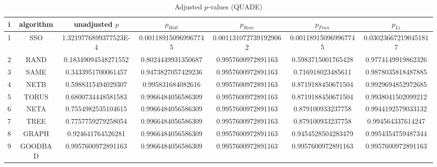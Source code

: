 \documentclass[a4paper,10pt]{article}
\begin{document}
\begin{landscape}
\begin{table}[!htp]
\centering\scriptsize
\caption{Adjusted $p$-values (QUADE)}
\begin{tabular}{ccccccc}
i&algorithm&unadjusted $p$&$p_{Holl}$&$p_{Rom}$&$p_{Finn}$&$p_{Li}$\\
\hline
1& SSO&1.3219776899377523E-4&0.001189150969967745&0.0011310727391929062&0.001189150969967745&0.030236672190451817\\
2& RAND&0.18349094548271552&0.8024449931350687&0.9957600972891163&0.5983715001765428&0.9774149919862326\\
3& SAME&0.3433951700061457&0.9473827057429236&0.9957600972891163&0.716918023485611&0.9878035818487885\\
4& NETB&0.5988315494029307&0.995831684082616&0.9957600972891163&0.8719188450671504&0.9929694852972685\\
5& TORUS&0.6800734448581583&0.9966484056586309&0.9957600972891163&0.8719188450671504&0.9938041502099212\\
6& NETA&0.7554982535104615&0.9966484056586309&0.9957600972891163&0.879100933237758&0.9944192579033132\\
7& TREE&0.7757759279258054&0.9966484056586309&0.9957600972891163&0.879100933237758&0.994564337614247\\
8& GRAPH&0.924641764526281&0.9966484056586309&0.9957600972891163&0.9454528504283479&0.9954354759487344\\
9& GOODBAD&0.9957600972891163&0.9966484056586309&0.9957600972891163&0.9957600972891163&0.9957600972891163\\
\hline
\end{tabular}
\end{table}

\end{landscape}
\end{document}
